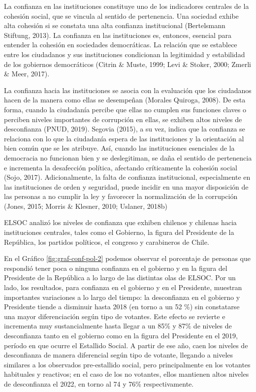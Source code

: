 \documentclass[
  12pt,
]{book}
\begin{document}
La confianza en las instituciones constituye uno de los indicadores centrales de la cohesión social, que se vincula al sentido de pertenencia. Una sociedad exhibe alta cohesión si se constata una alta confianza institucional (Bertelsmann Stiftung, 2013). La confianza en las instituciones es, entonces, esencial para entender la cohesión en sociedades democráticas. La relación que se establece entre los ciudadanos y sus instituciones condicionan la legitimidad y estabilidad de los gobiernos democráticos (Citrin \& Muste, 1999; Levi \& Stoker, 2000; Zmerli \& Meer, 2017).

La confianza hacia las instituciones se asocia con la evaluación que los ciudadanos hacen de la manera como ellas se desempeñan (Morales Quiroga, 2008). De esta forma, cuando la ciudadanía percibe que ellas no cumplen sus funciones claves o perciben niveles importantes de corrupción en ellas, se exhiben altos niveles de desconfianza (PNUD, 2019). Segovia (2015), a su vez, indica que la confianza se relaciona con lo que la ciudadanía espera de las instituciones y la orientación al bien común que se les atribuye. Así, cuando las instituciones esenciales de la democracia no funcionan bien y se deslegitiman, se daña el sentido de pertenencia e incrementa la desafección política, afectando críticamente la cohesión social (Sojo, 2017). Adicionalmente, la falta de confianza institucional, especialmente en las instituciones de orden y seguridad, puede incidir en una mayor disposición de las personas a no cumplir la ley y favorecer la normalización de la corrupción (Jones, 2015; Morris \& Klesner, 2010; Uslaner, 2018b)

ELSOC analizó los niveles de confianza que exhiben chilenos y chilenas hacia instituciones centrales, tales como el Gobierno, la figura del Presidente de la República, los partidos políticos, el congreso y carabineros de Chile.

En el Gráfico \ref{fig:graf-conf-pol-2} podemos observar el porcentaje de personas que respondió tener poca o ninguna confianza en el gobierno y en la figura del Presidente de la República a lo largo de las distintas olas de ELSOC. Por un lado, los resultados, para confianza en el gobierno y en el Presidente, muestran importantes variaciones a lo largo del tiempo: la desconfianza en el gobierno y Presidente tiende a disminuir hasta 2018 (en torno a un 52 \%) sin constatarse una mayor diferenciación según tipo de votantes. Este efecto se revierte e incrementa muy sustancialmente hasta llegar a un 85\% y 87\% de niveles de desconfianza tanto en el gobierno como en la figura del Presidente en el 2019, período en que ocurre el Estallido Social. A partir de ese año, caen los niveles de desconfianza de manera diferencial según tipo de votante, llegando a niveles similares a los observados pre-estallido social, pero principalmente en los votantes habituales y reactivos; en el caso de los no votantes, ellos mantienen altos niveles de desconfianza el 2022, en torno al 74 y 76\% respectivamente.
\end{document}
